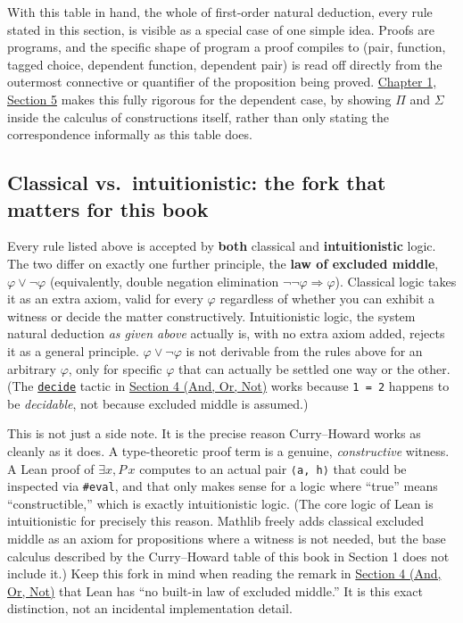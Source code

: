 With this table in hand, the whole of first-order natural deduction, every rule stated in this section, is visible as a special case of one simple idea. Proofs are programs, and the specific shape of program a proof compiles to (pair, function, tagged choice, dependent function, dependent pair) is read off directly from the outermost connective or quantifier of the proposition being proved. \hyperref[sec:01-basics:05-pi-sigma-and-coc:1]{Chapter 1, Section 5} makes this fully rigorous for the dependent case, by showing \(\Pi\) and \(\Sigma\) inside the calculus of constructions itself, rather than only stating the correspondence informally as this table does.

\subsection{Classical vs.~intuitionistic: the fork that matters for this book}\label{sec:03-propositions-and-proofs:02-logic-recap:7}

Every rule listed above is accepted by \textbf{both} classical and \textbf{intuitionistic} logic. The two differ on exactly one further principle, the \textbf{law of excluded middle}, \(\varphi \vee \neg\varphi\) (equivalently, double negation elimination \(\neg\neg\varphi \Rightarrow \varphi\)). Classical logic takes it as an extra axiom, valid for every \(\varphi\) regardless of whether you can exhibit a witness or decide the matter constructively. Intuitionistic logic, the system natural deduction \emph{as given above} actually is, with no extra axiom added, rejects it as a general principle. \(\varphi \vee \neg\varphi\) is not derivable from the rules above for an arbitrary \(\varphi\), only for specific \(\varphi\) that can actually be settled one way or the other. (The \href{https://lean-lang.org/doc/reference/latest/Tactic-Proofs/Tactic-Reference/}{\texttt{decide}} tactic in \hyperref[sec:03-propositions-and-proofs:05-and-or-not:1]{Section 4 (And, Or, Not)} works because \texttt{1 = 2} happens to be \emph{decidable}, not because excluded middle is assumed.)

This is not just a side note. It is the precise reason Curry--Howard works as cleanly as it does. A type-theoretic proof term is a genuine, \emph{constructive} witness. A Lean proof of \(\exists x, P\, x\) computes to an actual pair \texttt{⟨a, h⟩} that could be inspected via \texttt{\#eval}, and that only makes sense for a logic where ``true'' means ``constructible,'' which is exactly intuitionistic logic. (The core logic of Lean is intuitionistic for precisely this reason. Mathlib freely adds classical excluded middle as an axiom for propositions where a witness is not needed, but the base calculus described by the Curry--Howard table of this book in Section 1 does not include it.) Keep this fork in mind when reading the remark in \hyperref[sec:03-propositions-and-proofs:05-and-or-not:1]{Section 4 (And, Or, Not)} that Lean has ``no built-in law of excluded middle.'' It is this exact distinction, not an incidental implementation detail.

